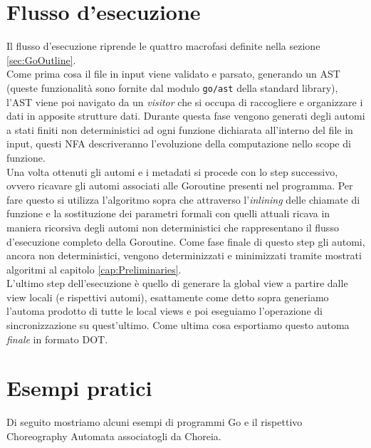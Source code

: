 \section{Flusso d'esecuzione}
Il flusso d'esecuzione riprende le quattro macrofasi definite nella sezione \ref{sec:GoOutline}.\bigskip\\
Come prima cosa il file in input viene validato e parsato, generando un AST (queste funzionalità sono fornite dal modulo \texttt{go/ast} della standard library), l'AST viene poi navigato da un \emph{visitor} che si occupa di raccogliere e organizzare i dati in apposite strutture dati. Durante questa fase vengono generati degli automi a stati finiti non deterministici ad ogni funzione dichiarata all'interno del file in input, questi NFA descriveranno l'evoluzione della computazione nello scope di funzione.\bigskip\\
Una volta ottenuti gli automi e i metadati si procede con lo step successivo, ovvero ricavare gli automi associati alle Goroutine presenti nel programma. Per fare questo si utilizza l'algoritmo sopra che attraverso l'\emph{inlining} delle chiamate di funzione e la sostituzione dei parametri formali con quelli attuali ricava in maniera ricorsiva degli automi non deterministici che rappresentano il flusso d'esecuzione completo della Goroutine. Come fase finale di questo step gli automi, ancora non deterministici, vengono determinizzati e minimizzati tramite mostrati algoritmi al capitolo \ref{cap:Preliminaries}.\bigskip\\
L'ultimo step dell'esecuzione è quello di generare la global view a partire dalle view locali (e rispettivi automi), esattamente come detto sopra generiamo l'automa prodotto di tutte le local views e poi eseguiamo l'operazione di sincronizzazione su quest'ultimo. Come ultima cosa esportiamo questo automa \emph{finale} in formato DOT.

\section{Esempi pratici}
Di seguito mostriamo alcuni esempi di programmi Go e il rispettivo Choreography Automata associatogli da Choreia. %


